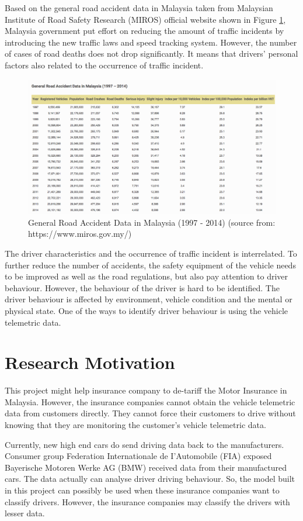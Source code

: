 Based on the general road accident data in Malaysia taken from Malaysian Institute of Road Safety Research (MIROS) official website shown in Figure \ref{fig:accident}, Malaysia government put effort on reducing the amount of traffic incidents by introducing the new traffic laws and speed tracking system. However, the number of cases of road deaths does not drop significantly. It means that drivers' personal factors also related to the occurrence of traffic incident.

\begin{figure}[hbt!]\centering
\includegraphics[width=.75\textwidth]{image/accident}
\caption{General Road Accident Data in Malaysia (1997 - 2014) (source from: https://www.miros.gov.my/)}
\label{fig:accident}
\end{figure}

The driver characteristics and the occurrence of traffic incident is interrelated. To further reduce the number of accidents, the safety equipment of the vehicle needs to be improved as well as the road regulations, but also pay attention to driver behaviour. However, the behaviour of the driver is hard to be identified. The driver behaviour is affected by environment, vehicle condition and the mental or physical state.\cite{miyaji:danno:oguri:2008} One of the ways to identify driver behaviour is using the vehicle telemetric data.

\section{Research Motivation}
This project might help insurance company to de-tariff the Motor Insurance in Malaysia. However, the insurance companies cannot obtain the vehicle telemetric data from customers directly. They cannot force their customers to drive without knowing that they are monitoring the customer's vehicle telemetric data.

Currently, new high end cars do send driving data back to the manufacturers. Consumer group Federation Internationale de I'Automobile (FIA) exposed Bayerische Motoren Werke AG (BMW) received data from their manufactured cars. The data actually can analyse driver driving behaviour.\cite{catherine:2015} So, the model built in this project can possibly be used when these insurance companies want to classify drivers. However, the insurance companies may classify the drivers with lesser data.

